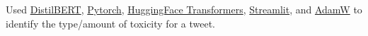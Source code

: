 {Used \href{https://huggingface.co/docs/transformers/model_doc/distilbert}{DistilBERT}, \href{https://pytorch.org/}{Pytorch}, \href{https://huggingface.co/docs/transformers/index}{HuggingFace Transformers}, \href{https://streamlit.io/}{Streamlit}, and \href{https://pytorch.org/docs/stable/generated/torch.optim.AdamW.html}{AdamW} to identify the type/amount of toxicity for a tweet.}
